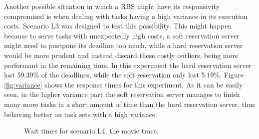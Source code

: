\documentclass[times, 10pt,twocolumn]{article}
\begin{document}
Another possible situation in which a RBS might have its responsivity
compromised is when dealing with tasks having a high variance in its
execution costs. Scenario L3 was designed to test this
possibility. This might happen because to serve tasks with
unexpectedly high costs, a soft reservation server might need to
postpone its deadline too much, while a hard reservation server would
be more prudent and instead discard these costly outliers, being more
performant in the remaining time. In this experiment the hard
reservation server lost 59.39\% of the deadlines, while the soft
reservation only lost 5.19\%. Figure \ref{fig:variance} shows the
response times for this experiment. As it can be easily seen, in the
higher variance part the soft reservation server manages to finish
many more tasks in a short amount of time than the hard reservation
server, thus behaving better on task sets with a high variance.

\begin{figure}[t]
  \centering
  \caption{Wait times for scenario L4, the movie trace.}
  \label{fig:eve}
\end{figure}
\end{document}
